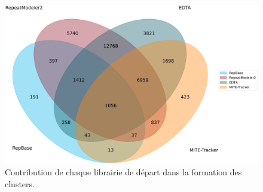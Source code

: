 \documentclass[10pt]{article}
\begin{document}
\bigskip

\begin{figure}[h]
    \centering
    \includegraphics[width=\textwidth]{img/plots/contribution_venn.eps}
    \caption{Contribution de chaque librairie de départ dans la formation des clusters.}
    \label{fig:contribution}
\end{figure}

\bigskip

\end{document}
